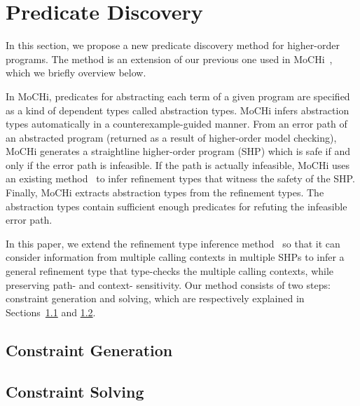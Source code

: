 \section{Predicate Discovery}

In this section, we propose a new predicate discovery method for 
higher-order programs.  The method is an extension of our previous one 
used in MoCHi~\cite{KobayashiPLDI2011}, which we briefly overview below.

In MoCHi, predicates for abstracting each term of a given program are 
specified as a kind of dependent types called abstraction types.  MoCHi 
infers abstraction types automatically in a counterexample-guided manner. 
 From an error path of an abstracted program (returned as a result of 
higher-order model checking), MoCHi generates a straightline 
higher-order program (SHP) which is safe if and only if the error path 
is infeasible.  If the path is actually infeasible, MoCHi uses an 
existing method~\cite{Unno2009} to infer refinement types that witness 
the safety of the SHP.  Finally, MoCHi extracts abstraction types from 
the refinement types.  The abstraction types contain sufficient enough 
predicates for refuting the infeasible error path.

In this paper, we extend the refinement type inference 
method~\cite{Unno2009} so that it can consider information from multiple 
calling contexts in multiple SHPs to infer a general refinement type 
that type-checks the multiple calling contexts, while preserving path- 
and context- sensitivity.  Our method consists of two steps: constraint 
generation and solving, which are respectively explained in 
Sections~\ref{sec:cg} and \ref{sec:cs}.

\subsection{Constraint Generation}
\label{sec:cg}

\subsection{Constraint Solving}
\label{sec:cs}

